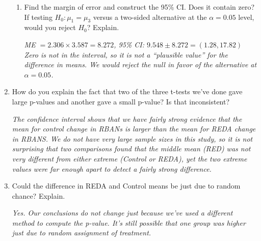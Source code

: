 \begin{enumerate}
\begin{enumerate}
   \item Find the margin of error and construct the 95\% CI.  Does it
     contain zero?  If testing 
     $H_0: \mu_1 = \mu_3$ versus a two-sided alternative at the
     $\alpha = 0.05$ level, would you reject $H_0$?  Explain.
\begin{students}
    \vspace{3cm}    
\end{students}

\begin{key}
  {\it  ME $=2.306 \times 3.587 =8.272 $, 95\% CI:   $9.548 \pm  
    8.272 = ( 1.28, 17.82)$ Zero is not in the interval, so it is not
    a ``plausible value'' for the difference in means.  We would
    reject the null in favor of the alternative at $\alpha = 0.05$.  }
\end{key}

   \end{enumerate}

 \item   How do you explain the fact that two of the three
   t-tests we've done gave large p-values and another gave a small p-value? Is
   that inconsistent? 
\begin{students}
    \vspace{3cm}    
\end{students}

\begin{key}
  {\it  The confidence interval shows that we have
    fairly strong evidence that the mean for control change in RBANs is
    larger than the mean for REDA change in RBANS. We do not have very
    large sample sizes in this study, so it is not surprising that two
    comparisons found that the middle mean (RED) was not very
    different from either extreme (Control or REDA), yet the two
    extreme values were far enough apart to detect a fairly strong
    difference. }
\end{key}

\item Could the difference in REDA and Control means be just due to
  random chance?  Explain.
\begin{students}
    \vspace{2cm}    
\end{students}

\begin{key}
  {\it Yes.  Our conclusions do not change just because we've used a
    different method to compute the p-value.  It's still possible that
  one group was higher just due to random assignment of treatment.}
\end{key}
\begin{students}
    \vspace{2cm}    
\end{students}


\end{enumerate}
